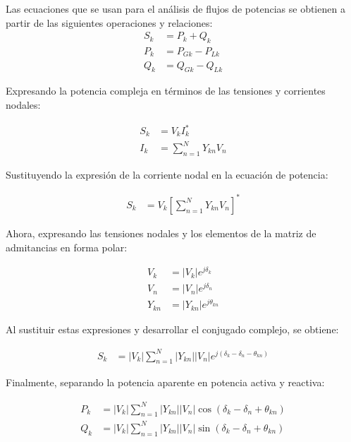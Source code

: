 \documentclass[11pt, letterpaper]{article}
\begin{document}
Las ecuaciones que se usan para el análisis de flujos de potencias se obtienen a partir de las siguientes operaciones y relaciones:
\begin{align*}
    S_k &= P_k + Q_k \\[1ex]
    P_k &= P_{Gk} - P_{Lk} \\[1ex]
    Q_k &= Q_{Gk} - Q_{Lk}
\end{align*}
\begin{center}
Expresando la potencia compleja en términos de las
tensiones y corrientes nodales:
\end{center}
\begin{align*}
    S_k &= V_k I_k^* \\[1ex]
    I_k &= \sum_{n=1}^{N}Y_{kn}V_n
\end{align*}
\begin{center}
    Sustituyendo la expresión de la corriente nodal en
la ecuación de potencia:
\end{center}
\begin{align*}
    S_k &=
    V_k
    \left[
        \sum_{n=1}^{N}Y_{kn}V_n
    \right]^*
\end{align*}
\begin{center}
    Ahora, expresando las tensiones nodales y los
elementos de la matriz de admitancias en forma polar:
\end{center}
\begin{align*}
    V_k &= |V_k|e^{j\delta_k} \\[1ex]
    V_n &= |V_n|e^{j\delta_n} \\[1ex]
    Y_{kn} &= |Y_{kn}|e^{j\theta_{kn}}
\end{align*}
\begin{center}
    Al sustituir estas expresiones y desarrollar el
conjugado complejo, se obtiene:
\end{center}
\begin{align*}
    S_k &=
    |V_k|
    \sum_{n=1}^{N}
    |Y_{kn}||V_n|
    e^{j(\delta_k-\delta_n-\theta_{kn})}
\end{align*}
\begin{center}
    Finalmente, separando la potencia aparente en potencia activa
y reactiva:
\end{center}
\begin{equation}
\begin{aligned}
    P_k &=
    |V_k|
    \sum_{n=1}^{N}
    |Y_{kn}||V_n|
    \cos(\delta_k-\delta_n+\theta_{kn}) \\[1ex]
    Q_k &=
    |V_k|
    \sum_{n=1}^{N}
    |Y_{kn}||V_n|
    \sin(\delta_k-\delta_n+\theta_{kn})
\end{aligned}
\label{Flujos de Potencia}
\end{equation}
\end{document}
